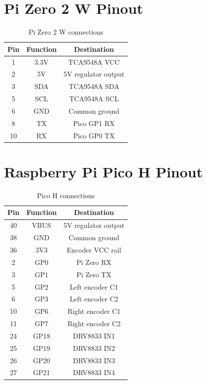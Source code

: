 \documentclass[a4paper,oneside,titlepage,11pt]{report}
\begin{document}
\section{Pi Zero 2 W Pinout}
\begin{table}[H]
\centering
\caption{Pi Zero 2 W connections}
\begin{tabular}{ccc}
\toprule
\textbf{Pin} & \textbf{Function} & \textbf{Destination} \\
\midrule
1  & 3.3V & TCA9548A VCC \\
2  & 5V   & 5V regulator output \\
3  & SDA  & TCA9548A SDA \\
5  & SCL  & TCA9548A SCL \\
6  & GND  & Common ground \\
8  & TX   & Pico GP1 RX \\
10 & RX   & Pico GP0 TX \\
\bottomrule
\end{tabular}
\end{table}

\section{Raspberry Pi Pico H Pinout}
\begin{table}[H]
\centering
\caption{Pico H connections}
\begin{tabular}{ccc}
\toprule
\textbf{Pin} & \textbf{Function} & \textbf{Destination} \\
\midrule
40 & VBUS & 5V regulator output \\
38 & GND  & Common ground \\
36 & 3V3  & Encoder VCC rail \\
2  & GP0  & Pi Zero RX \\
3  & GP1  & Pi Zero TX \\
5  & GP2  & Left encoder C1 \\
6  & GP3  & Left encoder C2 \\
10 & GP6  & Right encoder C1 \\
11 & GP7  & Right encoder C2 \\
24 & GP18 & DRV8833 IN1 \\
25 & GP19 & DRV8833 IN2 \\
26 & GP20 & DRV8833 IN3 \\
27 & GP21 & DRV8833 IN4 \\
\bottomrule
\end{tabular}
\end{table}
\end{document}
